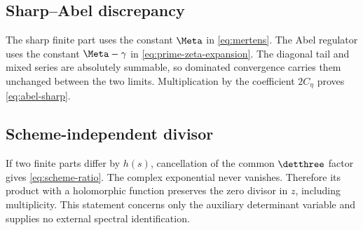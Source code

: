 \subsection{Sharp--Abel discrepancy}

The sharp finite part uses the constant $\Meta$ in
\eqref{eq:mertens}.  The Abel regulator uses the constant
$\Meta-\gamma$ in \eqref{eq:prime-zeta-expansion}.  The diagonal tail and
mixed series are absolutely summable, so dominated convergence carries them
unchanged between the two limits.  Multiplication by the coefficient
$2C_\eta$ proves \eqref{eq:abel-sharp}.

\subsection{Scheme-independent divisor}

If two finite parts differ by $h(s)$, cancellation of the common
$\detthree$ factor gives \eqref{eq:scheme-ratio}.  The complex exponential
never vanishes.  Therefore its product with a holomorphic function preserves
the zero divisor in $z$, including multiplicity.  This statement concerns
only the auxiliary determinant variable and supplies no external spectral
identification.
